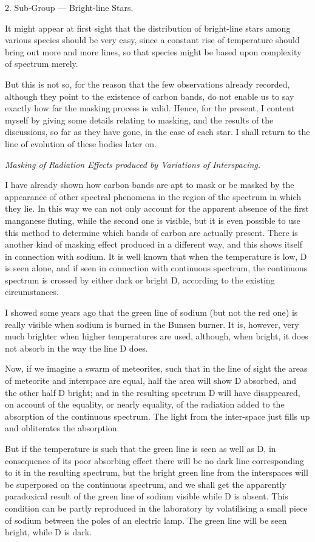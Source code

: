 \documentclass[a4paper, 12pt, oneside, polutonikogreek, english]{article}
\begin{document}
2. Sub-Group --- Bright-line Stars.

It might appear at first sight that the distribution of bright-line stars among various species should be very easy, since a constant rise of temperature should bring out more and more lines, so that species might be based upon complexity of spectrum merely.

But this is not so, for the reason that the few observations already recorded, although they point to the existence of carbon bands, do not enable us to say exactly how far the masking process is valid. Hence, for the present, I content myself by giving some details relating to masking, and the results of the discussions, so far as they have gone, in the case of each star. I shall return to the line of evolution of these bodies later on.

\emph{Masking of Radiation Effects produced by Variations of Interspacing.}

I have already shown how carbon bands are apt to mask or be masked by the appearance of other spectral phenomena in the region of the spectrum in which they lie. In this way we can not only account for the apparent absence of the first manganese fluting, while the second one is visible, but it is even possible to use this method to determine which bands of carbon are actually present. There is another kind of masking effect produced in a different way, and this shows itself in connection with sodium. It is well known that when the temperature is low, D is seen alone, and if seen in connection with continuous spectrum, the continuous spectrum is crossed by either dark or bright D, according to the existing circumstances.

I showed some years ago that the green line of sodium (but not the red one) is really visible when sodium is burned in the Bunsen burner. It is, however, very much brighter when higher temperatures are used, although, when bright, it does not absorb in the way the line D does.

Now, if we imagine a swarm of meteorites, such that in the line of sight the areas of meteorite and interspace are equal, half the area will show D absorbed, and the other half D bright; and in the resulting spectrum D will have disappeared, on account of the equality, or nearly equality, of the radiation added to the absorption of the continuous spectrum. The light from the inter-space just fills up and obliterates the absorption.

But if the temperature is such that the green line is seen as well as D, in consequence of its poor absorbing effect there will be no dark line corresponding to it in the resulting spectrum, but the bright green line from the interspaces will be superposed on the continuous spectrum, and we shall get the apparently paradoxical result of the green line of sodium visible while D is absent. This condition can be partly reproduced in the laboratory by volatilising a small piece of sodium between the poles of an electric lamp. The green line will be seen bright, while D is dark.
\end{document}
